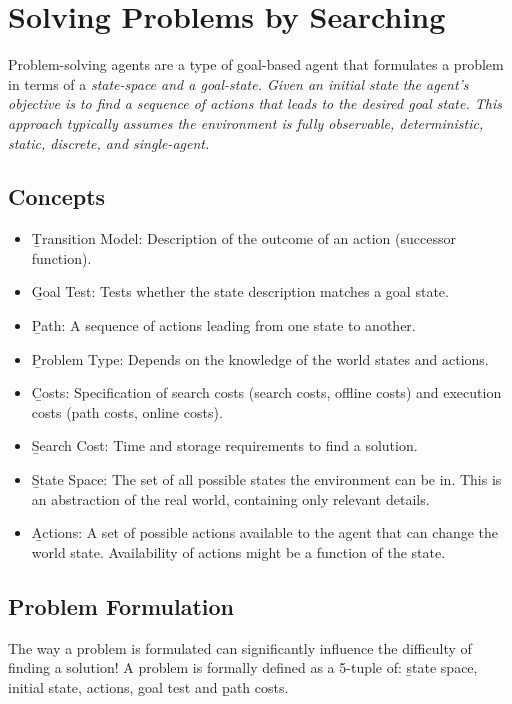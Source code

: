 \section{Solving Problems by Searching}
Problem-solving agents are a type of goal-based agent that formulates a problem in terms of a \it{state-space} and a \it{goal-state}. Given an \it{initial state} the agent's objective is to find a sequence of actions that leads to the desired goal state. This approach typically assumes the environment is fully observable, deterministic, static, discrete, and single-agent.

\subsection{Concepts}
\begin{itemize}
     \item \b{Transition Model:} Description of the outcome of an action (successor function).
     \item \b{Goal Test:} Tests whether the state description matches a goal state.
     \item \b{Path:} A sequence of actions leading from one state to another.
     \item \b{Problem Type:} Depends on the knowledge of the world states and actions.
     \item \b{Costs:} Specification of search costs (search costs, offline costs) and execution costs (path costs, online costs).
     \item \b{Search Cost:} Time and storage requirements to find a solution.
     \item \b{State Space:} The set of all possible states the environment can be in. This is an abstraction of the real world, containing only relevant details.
     \item \b{Actions:} A set of possible actions available to the agent that can change the world state. Availability of actions might be a function of the state.
\end{itemize}

\subsection{Problem Formulation}
The way a problem is formulated can significantly influence the difficulty of finding a solution! A problem is formally defined as a 5-tuple of: \b{state space, initial state, actions, goal test} and \b{path costs}.

